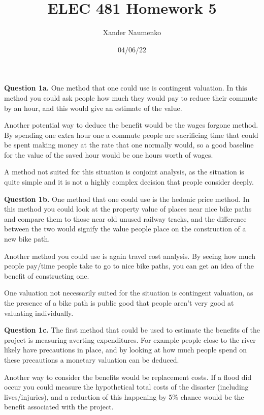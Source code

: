\documentclass[letterpaper, reqno,11pt]{article}
\begin{document}
\title{ELEC 481 Homework 5}
\date{04/06/22}
\author{Xander Naumenko}
\maketitle

{\noindent\bf Question 1a.} One method that one could use is contingent valuation. In this method you could ask people how much they would pay to reduce their commute by an hour, and this would give an estimate of the value. 

Another potential way to deduce the benefit would be the wages forgone method. By spending one extra hour one a commute people are sacrificing time that could be spent making money at the rate that one normally would, so a good baseline for the value of the saved hour would be one hours worth of wages. 

A method not suited for this situation is conjoint analysis, as the situation is quite simple and it is not a highly complex decision that people consider deeply. 

{\noindent\bf Question 1b.} One method that one could use is the hedonic price method. In this method you could look at the property value of places near nice bike paths and compare them to those near old unused railway tracks, and the difference between the two would signify the value people place on the construction of a new bike path. 

Another method you could use is again travel cost analysis. By seeing how much people pay/time people take to go to nice bike paths, you can get an idea of the benefit of constructing one. 

One valuation not necessarily suited for the situation is contingent valuation, as the presence of a bike path is public good that people aren't very good at valuating individually. 

{\noindent\bf Question 1c.} The first method that could be used to estimate the benefits of the project is measuring averting expenditures. For example people close to the river likely have precautions in place, and by looking at how much people spend on these precautions a monetary valuation can be deduced. 

Another way to consider the benefits would be replacement costs. If a flood did occur you could measure the hypothetical total costs of the disaster (including lives/injuries), and a reduction of this happening by 5\% chance would be the benefit associated with the project. 
\end{document}
